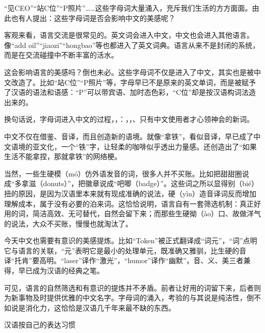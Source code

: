 \documentclass[11pt,a4paper]{ctexart}
\begin{document}
{\ywkai “见CEO”“站C位”“P照片”……这些字母词大量涌入，充斥我们生活的方方面面。由此也有人提出：这些字母词是否会影响中文的美感呢？\par
客观来看，语言交流是很常见的。英文词会进入中文，中文也会进入其他语言。像“add oil”\allowbreak“jiaozi”\allowbreak“hongbao”等也都进入了英文词典。语言从来不是封闭的系统，而是在交流碰撞中不断丰富的活水。\par
这会影响语言的美感吗？倒也未必。这些字母词不仅是进入了中文，其实也是被中文改造了。比如“站C位”“P照片”等，字母早已不是原来的英文单词，而是被赋予了汉语的语法和语感：“P”可以带宾语、加时态色彩，“C位”却是按汉语构词法造出来的。\par
换句话说，字母词进入中文的过程，\blank[3em]，\blank[3em]：\blank[3em]，\blank[3em]，\blank[3em]、只有中文使用者才心领神会的新词。\par
中文不仅在借鉴、音译，而且创造新的语境。就像“拿铁”，看似音译，早已成了中文语境的亚文化，一个“铁”字，让轻柔的咖啡似乎透出力量感。还创造出了“如果生活不能拿捏，那就拿铁”的网络梗。\par
当然，一些生硬模（mó）仿外语发音的词，很多人并不买账。比如把甜甜圈说成“多拿滋（donuts）”，把徽章说成“吧唧（badge）”。这些词之所以显得别（bié）扭的原因，是因为汉语里本来就有现成准确的说法，硬（yìn）造音译词反而增加理解成本，属于没有必要的泊来词。这恰恰说明，语言自有一套筛选机制：真正好用的词，简洁高效、无可替代，自然会留下来；而那些生硬拗（ào）口、故做洋气的说法，大众不买账，慢慢也就淘汰了。\par
今天中文也需要有意识的美感提炼。比如“Token”被正式翻译成“词元”，“词”点明它与语言的关联，“元”表明它是最小的处理单元，既准确又雅驯，比生硬的音译“托肯”要高明。“laser”译作“激光”，“humor”译作“幽默”，音、义、美三者兼得，早已成为汉语的经典之笔。\par
可见，语言的自然筛选和有意识的提炼并不矛盾。前者让好用的词留下来，后者则为新事物及时提供优雅的中文名字。字母词的涌入，考验的与其说是纯洁性，倒不如说是消化力，这恰恰是汉语几千年来最不缺的东西。\par}


\par\vspace{2.2em}

汉语按自己的表达习惯
\end{document}
